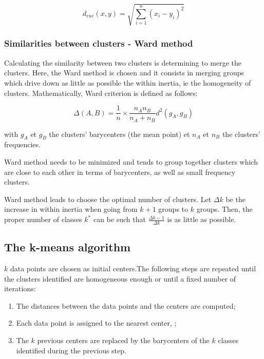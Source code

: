 \documentclass[
]{book}
\providecommand{\tightlist}{%
  \setlength{\itemsep}{0pt}\setlength{\parskip}{0pt}}
\begin{document}
\begin{equation}
  d_{euc}(x,y) = \sqrt{\sum_{i=1}^n(x_i - y_i)^2}
  \label{eq:euclidean}
\end{equation}

\hypertarget{similarities-between-clusters---ward-method}{%
\subsubsection*{Similarities between clusters - Ward method}\label{similarities-between-clusters---ward-method}}

Calculating the similarity between two clusters is determining to merge the clusters. Here, the Ward method \citep{UNSUPERVISED_CLASSIF} is chosen and it consists in merging groups which drive down as little as possible the within inertia, ie the homogeneity of clusters. Mathematically, Ward criterion is defined as follows:

\begin{equation}
  \Delta (A, B) = \frac{1}{n} \times \frac{n_A n_B}{n_A + n_B}d^2(g_A, g_B)
  \label{eq:ward}
\end{equation}

with \(g_A\) et \(g_B\) the clusters' barycenters (the mean point) et \(n_A\) et \(n_B\) the clusters' frequencies.

Ward method needs to be minimized and tends to group together clusters which are close to each other in terms of barycenters, as well as small frequency clusters.

Ward method leads to choose the optimal number of clusters. Let \(\Delta k\) be the increase in within inertia when going from \(k+1\) groups to \(k\) groups. Then, the proper number of classes \(k^*\) can be such that \(\frac{\Delta k-1}{\Delta k}\) is as little as possible.

\hypertarget{the-k-means-algorithm}{%
\subsection{The k-means algorithm}\label{the-k-means-algorithm}}

\(k\) data points are chosen as initial centers.The following steps are repeated until the clusters identified are homogeneous enough or until a fixed number of iterations:

\begin{enumerate}
\def\labelenumi{\arabic{enumi}.}
\tightlist
\item
  The distances between the data points and the centers are computed;
\item
  Each data point is assigned to the nearest center, ;
\item
  The \(k\) previous centers are replaced by the barycenters of the \(k\) classes identified during the previous step.
\end{enumerate}
\end{document}
